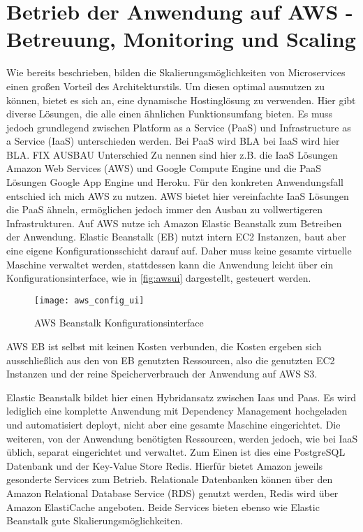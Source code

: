 \section{Betrieb der Anwendung auf AWS - Betreuung, Monitoring und Scaling}
Wie bereits beschrieben, bilden die Skalierungsmöglichkeiten von Microservices einen großen Vorteil des Architekturstils. Um diesen optimal ausnutzen zu können, bietet es sich an, eine dynamische Hostinglösung zu verwenden. Hier gibt diverse Lösungen, die alle einen ähnlichen Funktionsumfang bieten. Es muss jedoch grundlegend zwischen Platform as a Service (PaaS) und Infrastructure as a Service (IaaS) unterschieden werden. 
Bei PaaS wird BLA bei IaaS wird hier BLA. FIX AUSBAU Unterschied
Zu nennen sind hier z.B. die IaaS Lösungen Amazon Web Services (AWS) und Google Compute Engine\cite{googlecompute} und die PaaS Lösungen Google App Engine\cite{googleapp} und Heroku\cite{heroku}.
Für den konkreten Anwendungsfall entschied ich mich AWS zu nutzen. AWS bietet hier vereinfachte IaaS Lösungen die PaaS ähneln, ermöglichen jedoch immer den Ausbau zu vollwertigeren Infrastrukturen.
Auf AWS nutze ich Amazon Elastic Beanstalk\cite{aws:beanstalk} zum Betreiben der Anwendung. Elastic Beanstalk (EB) nutzt intern EC2 Instanzen, baut aber eine eigene Konfigurationsschicht darauf auf. Daher muss keine gesamte virtuelle Maschine verwaltet werden, stattdessen kann die Anwendung leicht über ein Konfigurationsinterface, wie in \autoref{fig:awsui} dargestellt, gesteuert werden.

\begin{figure}[!ht]
    \centering
    \caption{AWS Beanstalk Konfigurationsinterface}
    \label{fig:awsui}
    \texttt{[image: aws\_config\_ui]}
\end{figure}
AWS EB ist selbst mit keinen Kosten verbunden, die Kosten ergeben sich ausschließlich aus den von EB genutzten Ressourcen, also die genutzten EC2 Instanzen und der reine Speicherverbrauch der Anwendung auf AWS S3. 

Elastic Beanstalk bildet hier einen Hybridansatz zwischen Iaas und Paas. Es wird lediglich eine komplette Anwendung mit Dependency Management hochgeladen und automatisiert deployt, nicht aber eine gesamte Maschine eingerichtet.
Die weiteren, von der Anwendung benötigten Ressourcen, werden jedoch, wie bei IaaS üblich, separat eingerichtet und verwaltet. Zum Einen ist dies eine PostgreSQL Datenbank und der Key-Value Store Redis. Hierfür bietet Amazon jeweils gesonderte Services zum Betrieb. Relationale Datenbanken können über den Amazon Relational Database Service (RDS)\cite{aws:rds} genutzt werden, Redis wird über Amazon ElastiCache\cite{aws:elasticache} angeboten. Beide Services bieten ebenso wie Elastic Beanstalk gute Skalierungsmöglichkeiten.

